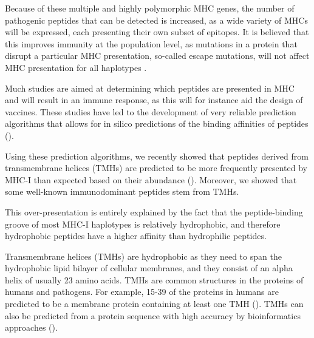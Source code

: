
Because of these multiple and highly polymorphic MHC genes,
the number of pathogenic peptides that can be detected is increased,
as a wide variety of MHCs will be expressed,
each presenting their own subset of epitopes.
It is believed that this improves immunity at the population level, 
as mutations in a protein that disrupt a particular MHC presentation, 
so-called escape mutations, 
will not affect MHC presentation for all haplotypes .


Much studies are aimed at determining which peptides are presented in MHC 
and will result in an immune response, 
as this will for instance aid the design of vaccines. 
These studies have led to the development 
of very reliable prediction algorithms 
that allows for in silico predictions 
of the binding affinities of peptides (\cite{larsen2010identification,schellens2008unanticipated,tang2011genome}).
 

Using these prediction algorithms, 
we recently showed that peptides derived 
from transmembrane helices (TMHs) 
are predicted to be more frequently presented by MHC-I 
than expected based on their abundance (\cite{bianchi2017}). 
Moreover, we showed that some well-known immunodominant peptides stem from TMHs. 

This over-presentation is entirely explained by the fact 
that the peptide-binding groove of most MHC-I haplotypes 
is relatively hydrophobic, 
and therefore hydrophobic peptides have a higher affinity 
than hydrophilic peptides. 



Transmembrane helices (TMHs) are hydrophobic 
as they need to span the hydrophobic lipid bilayer of cellular membranes, 
and they consist of an alpha helix of usually 23 amino acids. 
TMHs are common structures in the proteins of humans and pathogens. 
For example, 
15-39%
of the proteins in humans 
are predicted to be a membrane protein 
containing at least one TMH (\cite{ahram2006estimation}). 
TMHs can also be predicted from a protein sequence 
with high accuracy by bioinformatics approaches (\cite{krogh2001predicting,bianchi2017,kall2004combined,arai2004conpred,jones2007improving,klammer2009metatm,wang2019efficient}).

